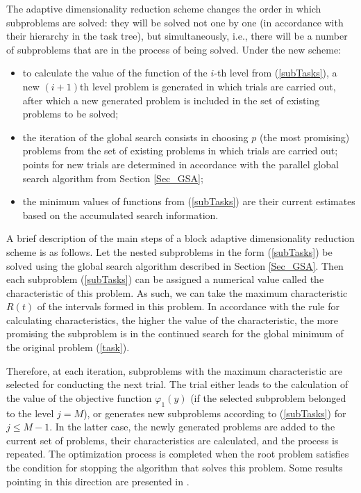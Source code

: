 \documentclass{svproc}
\begin{document}
The adaptive dimensionality reduction scheme changes the order in which subproblems are solved: they will be solved not one by one (in accordance with their hierarchy in the task tree), but simultaneously, i.e., there will be a number of subproblems that are in the process of being solved. Under the new scheme:	
	\begin{itemize}
		\item to calculate the value of the function of the \(i\)-th level from (\ref{subTasks}), a new \((i+1)\)th level problem is generated in which trials are carried out, after which a new generated problem is included in the set of existing problems to be solved;
		\item the iteration of the global search consists in choosing \(p\) (the most promising) problems from the set of existing problems in which trials are carried out; points for new trials are determined in accordance with the parallel global search algorithm from Section \ref{Sec_GSA};
		\item the minimum values of functions from (\ref{subTasks}) are their current estimates based on the accumulated search information.
	\end{itemize}
     
A brief description of the main steps of a block adaptive dimensionality reduction scheme is as follows.
Let the nested subproblems in the form (\ref{subTasks}) be solved using the global search algorithm described in Section \ref{Sec_GSA}. Then each subproblem (\ref{subTasks}) can be assigned a numerical value called the characteristic of this problem. As such, we can take the maximum characteristic \(R(t)\) of the intervals formed in this problem. In accordance with the rule for calculating characteristics, the higher the value of the characteristic, the more promising the subproblem is in the continued search for the global minimum of the original problem (\ref{task}). 

Therefore, at each iteration, subproblems with the maximum characteristic are selected for conducting the next trial. The trial either leads to the calculation of the value of the objective function \(\varphi_1(y)\) (if the selected subproblem belonged to the level \(j=M\)), or generates new subproblems according to (\ref{subTasks}) for \(j \leqslant  M-1\). In the latter case, the newly generated problems are added to the current set of problems, their characteristics are calculated, and the process is repeated. The optimization process is completed when the root problem satisfies the condition for stopping the algorithm that solves this problem. Some results pointing in this direction are presented in \cite{Barkalov2020}.
\end{document}
